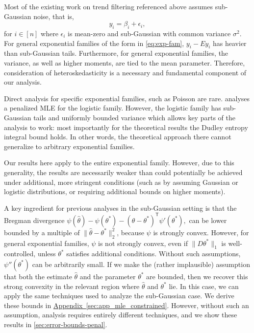 \documentclass[ejs,noshowframe]{imsart}
\theoremstyle{plain}
\theoremstyle{definition}
\newcommand{\aref}[1]{\hyperref[#1]{Appendix~\ref*{#1}}}
\newcommand{\snorm}[1]{\lVert #1 \rVert}
\newcommand{\E}{E}
\renewcommand{\hat}{\widehat}
\renewcommand{\top}{\mathsf{T}}
\begin{document}
Most of the existing work on trend filtering referenced above assumes
sub-Gaussian noise, that is,  
$$
y_i = \beta_i + \epsilon_i,
$$
for $i\in [n]$ where $\epsilon_i$ is mean-zero and sub-Gaussian with common variance $\sigma^2$.
For general exponential families of the form in  \eqref{eq:exp-fam}, 
$y_i - \E y_i$ has heavier than sub-Gaussian tails.
Furthermore, for general exponential
families, the variance, as well as higher moments, are tied to the mean parameter.
Therefore, consideration of heteroskedasticity is a
necessary and fundamental component of our analysis. 

Direct analysis for specific exponential families, such as Poisson
\citep{Bassett2019fused} are rare.
 analyses a penalized MLE for the logistic family.
However, the logistic family has sub-Gaussian tails and uniformly bounded
variance which allows key parts of the
analysis to work: most importantly for the theoretical results the Dudley entropy integral bound holds. 
In other words, the theoretical approach there cannot generalize to arbitrary exponential families.

Our results here
apply to the entire exponential family. However, due to this generality, the results are
necessarily weaker than could potentially be achieved under additional, 
more stringent conditions (such as by assuming Gaussian or logistic
distributions, or requiring additional bounds on higher moments).  

A key ingredient for previous analyses in the sub-Gaussian setting is that the Bregman
divergence  
$\psi(\hat\theta) - \psi(\theta^*) - (\hat\theta 
- \theta^*)^\top \psi'(\theta^*),$ 
can be lower bounded by a multiple of $ \| \hat\theta - \theta^* \|_2^2$, 
because $\psi$ is strongly convex. 
However, for general exponential families, $\psi$ is not strongly convex, even if 
$\snorm{D\theta^*}_1$ is well-controlled, unless
$\theta^*$ satisfies additional conditions.
Without such assumptions, $\psi''(\theta^*)$ can be arbitrarily small.
If we make the (rather implausible) assumption that both the estimate
$\hat\theta$ and the parameter $\theta^*$ are bounded, 
then we recover this strong convexity in the relevant region where $\hat\theta$
and $\theta^*$ 
lie. In this case, we can apply the same techniques used to analyze the sub-Gaussian case. 
We derive these bounds in \aref{sec:app_mle_constrained}.
However, without such an assumption, analysis requires entirely different
techniques, and we show these results in \autoref{sec:error-bounds-penal}. 
\end{document}
